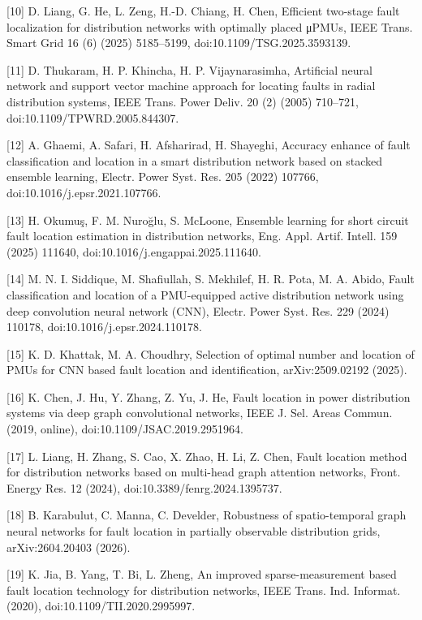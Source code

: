 \documentclass[
  11pt,
]{ctexart}
\begin{document}
{[}10{]} D. Liang, G. He, L. Zeng, H.-D. Chiang, H. Chen, Efficient
two-stage fault localization for distribution networks with optimally
placed μPMUs, IEEE Trans. Smart Grid 16 (6) (2025) 5185--5199,
doi:10.1109/TSG.2025.3593139.

{[}11{]} D. Thukaram, H. P. Khincha, H. P. Vijaynarasimha, Artificial
neural network and support vector machine approach for locating faults
in radial distribution systems, IEEE Trans. Power Deliv. 20 (2) (2005)
710--721, doi:10.1109/TPWRD.2005.844307.

{[}12{]} A. Ghaemi, A. Safari, H. Afsharirad, H. Shayeghi, Accuracy
enhance of fault classification and location in a smart distribution
network based on stacked ensemble learning, Electr. Power Syst. Res. 205
(2022) 107766, doi:10.1016/j.epsr.2021.107766.

{[}13{]} H. Okumuş, F. M. Nuroğlu, S. McLoone, Ensemble learning for
short circuit fault location estimation in distribution networks, Eng.
Appl. Artif. Intell. 159 (2025) 111640,
doi:10.1016/j.engappai.2025.111640.

{[}14{]} M. N. I. Siddique, M. Shafiullah, S. Mekhilef, H. R. Pota, M.
A. Abido, Fault classification and location of a PMU-equipped active
distribution network using deep convolution neural network (CNN),
Electr. Power Syst. Res. 229 (2024) 110178,
doi:10.1016/j.epsr.2024.110178.

{[}15{]} K. D. Khattak, M. A. Choudhry, Selection of optimal number and
location of PMUs for CNN based fault location and identification,
arXiv:2509.02192 (2025).

{[}16{]} K. Chen, J. Hu, Y. Zhang, Z. Yu, J. He, Fault location in power
distribution systems via deep graph convolutional networks, IEEE J. Sel.
Areas Commun. (2019, online), doi:10.1109/JSAC.2019.2951964.

{[}17{]} L. Liang, H. Zhang, S. Cao, X. Zhao, H. Li, Z. Chen, Fault
location method for distribution networks based on multi-head graph
attention networks, Front. Energy Res. 12 (2024),
doi:10.3389/fenrg.2024.1395737.

{[}18{]} B. Karabulut, C. Manna, C. Develder, Robustness of
spatio-temporal graph neural networks for fault location in partially
observable distribution grids, arXiv:2604.20403 (2026).

{[}19{]} K. Jia, B. Yang, T. Bi, L. Zheng, An improved
sparse-measurement based fault location technology for distribution
networks, IEEE Trans. Ind. Informat. (2020),
doi:10.1109/TII.2020.2995997.
\end{document}
